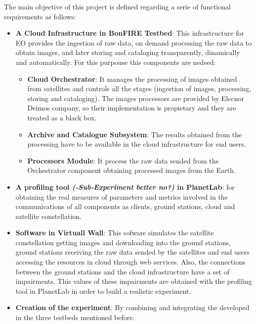 The main objective of this project is defined regarding a serie of functional
requirements as follows:
\begin{itemize}
  
\item {\textbf{A Cloud Infrastructure in BonFIRE Testbed}: This
  infrastructure for EO provides the ingestion of raw data, on demand processing the raw
  data to obtain images, and later storing and cataloging transparently,
  dinamically and automatically. For this purpouse this components are nedeed:
}
\begin{itemize}

\item{\textbf{Cloud Orchestrator}: It manages the
  processing of images obtained from satellites and controls all the stages
  (ingestion of images, processing, storing and cataloging). The images
  processors are provided by Elecnor Deimos company, so their implementation is propietary and they are treated as a black box.}
\item {\textbf{Archive and Catalogue Subsystem}: The
  results obtained from the processing have to be available in the cloud
  infrastructure for end users.}
\item{\textbf{Processors Module}: It process the raw data sended from
  the Orchestrator component obtaining processed images from the Earth.}  
\end{itemize}
\item {\textbf{A profiling tool\emph{ (-Sub-Experiment better no?)} in PlanetLab}: for obtaining the real measures of
  parameters and metrics involved in the communications of all components as
  clients, ground stations, cloud and satellite constellation.}


\item {\textbf{Software in Virtuall Wall}: This sofware simulates the satellite
  constellation getting images and downloading into the ground stations, ground
  stations receiving the raw data sended by the satellites and end users
  accessing the resources in cloud through web services. Also, the connections
  between the ground stations and the cloud infrastructure have a set of
  impairments. This values of these impairments are obtained with the profiling tool in
  PlanetLab in order to build a  realistic experiment.}

\item {\textbf{Creation of the experiment}: By combining and integrating
  the developed in the three testbeds mentioned before.}


\end{itemize}

